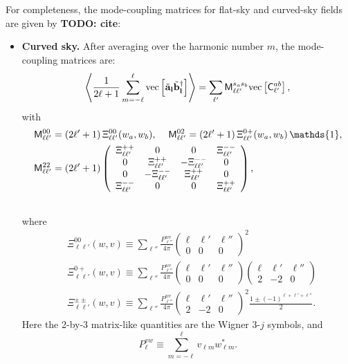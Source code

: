 \documentclass[a4paper,11pt]{article}
\newcommand{\todo}[1]{{\bf TODO: #1}}
\newcommand{\wtj}[6]{\left(\begin{array}{ccc} #1 & #2 & #3\\#4 & #5 & #6\end{array} \right)}
\begin{document}
      For completeness, the mode-coupling matrices for flat-sky and curved-sky fields are given by \todo{cite}:
      \begin{itemize}
        \item {\bf Curved sky.} After averaging over the harmonic number $m$, the mode-coupling matrices are:
        \begin{equation}\label{eq:mcms}
          \left\langle\frac{1}{2\ell+1}\sum_{m=-\ell}^\ell {\rm vec}\left[\tilde{\bf a}_{\bf l}\tilde{\bf b}^\dag_{\bf l}\right]\right\rangle=\sum_{\ell'}{\sf M}^{s_as_b}_{\ell\ell'} {\rm vec}\left[{\sf C}^{ab}_{\ell'}\right],
        \end{equation}
        with
        \begin{align}
          &{\sf M}^{00}_{\ell\ell'}=(2\ell'+1)\,\Xi^{00}_{\ell\ell'}(w_a,w_b),\hspace{12pt}
          {\sf M}^{02}_{\ell\ell'}=(2\ell'+1)\,\Xi^{0+}_{\ell\ell'}(w_a,w_b)\,\mathds{1},\\
          &{\sf M}^{22}_{\ell\ell'}=(2\ell'+1)
          \left(
          \begin{array}{cccc}
            \Xi^{++}_{\ell\ell'} & 0 & 0 & \Xi^{--}_{\ell\ell'} \\
            0 & \Xi^{++}_{\ell\ell'} & -\Xi^{--}_{\ell\ell'} & 0 \\
            0 & -\Xi^{--}_{\ell\ell'} & \Xi^{++}_{\ell\ell'} & 0 \\
            \Xi^{--}_{\ell\ell'} & 0 & 0 & \Xi^{++}_{\ell\ell'}
          \end{array}\right),\\\nonumber
        \end{align}
        where
        \begin{align}\label{eq:coeff_mcm}
          &\Xi^{00}_{\ell\ell'}(w,v)  \equiv\sum_{\ell''}\frac{P^{wv}_{\ell''}}{4\pi}\wtj{\ell}{\ell'}{\ell''}{0}{0}{0}^2\\
          &\Xi^{0+}_{\ell\ell'}(w,v)  \equiv\sum_{\ell''}\frac{P^{wv}_{\ell''}}{4\pi}\wtj{\ell}{\ell'}{\ell''}{0}{0}{0}\wtj{\ell}{\ell'}{\ell''}{2}{-2}{0}\\
          &\Xi^{\pm\pm}_{\ell\ell'}(w,v) \equiv\sum_{\ell''}\frac{P^{wv}_{\ell''}}{4\pi}\wtj{\ell}{\ell'}{\ell''}{2}{-2}{0}^2\frac{1\pm(-1)^{\ell+\ell'+\ell''}}{2}.
        \end{align}
        Here the 2-by-3 matrix-like quantities are the Wigner 3-$j$ symbols, and
        \begin{equation}
          P^{vw}_\ell\equiv\sum_{m=-\ell}^\ell v_{\ell m}w^*_{\ell m}.

\end{equation}
\end{itemize}
\end{document}
